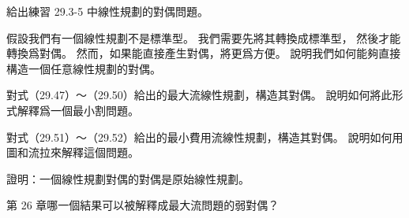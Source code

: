 \startsection[
  title={Duality},
]

\startEXERCISE
給出練習 29.3-5 中線性規劃的對偶問題。
\stopEXERCISE

\startANSWER
{}
\stopANSWER

\startEXERCISE
假設我們有一個線性規劃不是標準型。
我們需要先將其轉換成標準型，
然後才能轉換爲對偶。
然而，如果能直接產生對偶，將更爲方便。
說明我們如何能夠直接構造一個任意線性規劃的對偶。
\stopEXERCISE

\startANSWER
{}
\stopANSWER

\startEXERCISE
對式（29.47）～（29.50）給出的最大流線性規劃，構造其對偶。
說明如何將此形式解釋爲一個最小割問題。
\stopEXERCISE

\startANSWER
{}
\stopANSWER

\startEXERCISE
對式（29.51）～（29.52）給出的最小費用流線性規劃，構造其對偶。
說明如何用圖和流拉來解釋這個問題。
\stopEXERCISE

\startANSWER
{}
\stopANSWER

\startEXERCISE
證明：一個線性規劃對偶的對偶是原始線性規劃。
\stopEXERCISE

\startANSWER
{}
\stopANSWER

\startEXERCISE
第 26 章哪一個結果可以被解釋成最大流問題的弱對偶？
\stopEXERCISE

\startANSWER
{}
\stopANSWER

\stopsection
